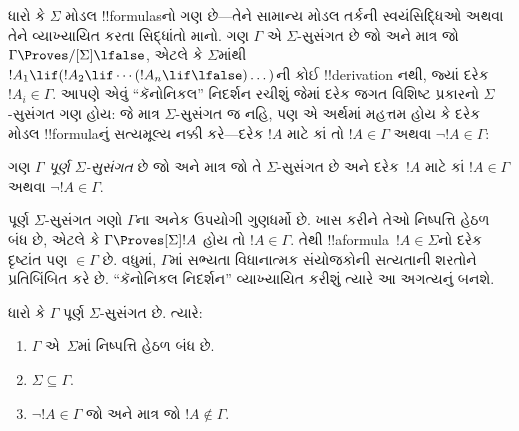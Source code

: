 \documentclass[../../../include/open-logic-section]{subfiles}
\begin{document}


ધારો કે $\Sigma$ મોડલ !!{formula}sનો ગણ છે—તેને સામાન્ય મોડલ
તર્કની સ્વયંસિદ્ધિઓ અથવા તેને વ્યાખ્યાયિત કરતા સિદ્ધાંતો માનો. ગણ
$\Gamma$ એ $\Sigma$-સુસંગત છે જો અને માત્ર જો $\Gamma
\Proves/[\Sigma] \lfalse$, એટલે કે $\Sigma$માંથી
$!A_1 \lif (!A_2 \lif \cdots (!A_n \lif \lfalse)\dots)$ની કોઈ
!!{derivation} નથી, જ્યાં દરેક $!A_i \in \Gamma$. આપણે એવું
``કૅનોનિકલ'' નિદર્શન રચીશું જેમાં દરેક જગત વિશિષ્ટ પ્રકારનો
$\Sigma$-સુસંગત ગણ હોય: જે માત્ર $\Sigma$-સુસંગત જ નહિ, પણ એ અર્થમાં
મહત્તમ હોય કે દરેક મોડલ !!{formula}નું સત્યમૂલ્ય નક્કી કરે—દરેક $!A$
માટે કાં તો $!A \in \Gamma$ અથવા $\lnot !A \in \Gamma$:

\begin{defn}
  ગણ $\Gamma$ \emph{પૂર્ણ $\Sigma$-સુસંગત} છે જો અને માત્ર જો તે
  $\Sigma$-સુસંગત છે અને દરેક~$!A$ માટે કાં $!A \in \Gamma$ અથવા
  $\lnot !A \in \Gamma$.
\end{defn}

પૂર્ણ $\Sigma$-સુસંગત ગણો $\Gamma$ના અનેક ઉપયોગી ગુણધર્મો છે.
ખાસ કરીને તેઓ નિષ્પત્તિ હેઠળ બંધ છે, એટલે કે $\Gamma
\Proves[\Sigma] !A$ હોય તો $!A \in \Gamma$. તેથી
!!a{formula}~$!A \in \Sigma$નો દરેક દૃષ્ટાંત પણ
$\in \Gamma$ છે. વધુમાં, $\Gamma$માં સભ્યતા વિધાનાત્મક સંયોજકોની
સત્યતાની શરતોને પ્રતિબિંબિત કરે છે. ``કૅનોનિકલ નિદર્શન'' વ્યાખ્યાયિત
કરીશું ત્યારે આ અગત્યનું બનશે.

\begin{prop}
  ધારો કે $\Gamma$ પૂર્ણ $\Sigma$-સુસંગત છે. ત્યારે:
  \begin{enumerate}
  \item {}%
    $\Gamma$ એ~$\Sigma$માં નિષ્પત્તિ હેઠળ બંધ છે.
  \item {}%
    $\Sigma \subseteq \Gamma$.
  \item {}%
    $\lnot!A \in \Gamma$ જો અને માત્ર જો $!A \notin
    \Gamma$.
  \end{enumerate}
\end{prop}
\end{document}
